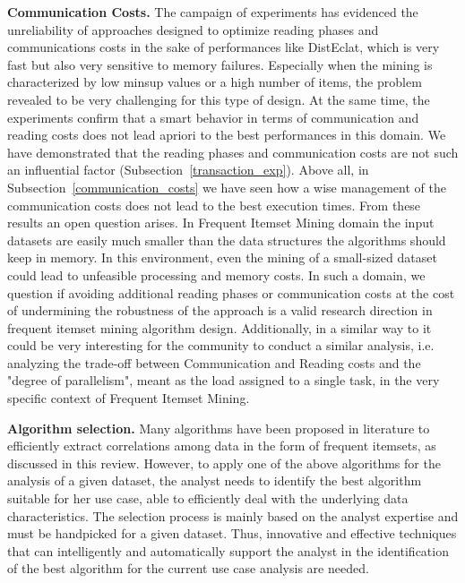 \textbf{Communication Costs.}
The campaign of experiments has evidenced the unreliability of approaches designed to optimize reading phases and communications costs in the sake of performances like DistEclat, which is very fast but also very sensitive to memory failures. Especially when the mining is characterized by low minsup values or a high number of items, the problem revealed to be very challenging for this type of design. 
At the same time, the experiments confirm that a smart behavior in terms of communication and reading costs does not lead apriori to the best performances in this domain. We have demonstrated that the reading phases and communication costs are not such an influential factor (Subsection~\ref{transaction_exp}). Above all, in Subsection~\ref{communication_costs} we have seen how a wise management of the communication costs does not lead to the best execution times. 
From these results an open question arises. In Frequent Itemset Mining domain the input datasets are easily much smaller than the data structures the algorithms should keep in memory. In this environment, even the mining of a small-sized dataset could lead to unfeasible processing and memory costs. In such a domain, we question if avoiding additional reading phases or communication costs at the cost of undermining the robustness of the approach is a valid research direction in frequent itemset mining algorithm design. 
Additionally, in a similar way to \cite{sarma2013upper} it could be very interesting for the community to conduct a similar analysis, i.e. analyzing the trade-off between Communication and Reading costs and the "degree of parallelism", meant as the load assigned to a single task, in the very specific context of Frequent Itemset Mining.




\textbf{Algorithm selection.}
Many algorithms have been proposed in literature
to efficiently extract correlations among data in the form of frequent itemsets,
as discussed in this review.
However, to apply one of the above algorithms for the analysis of a given
dataset, the analyst needs to identify
the best algorithm suitable for her use case,
able to efficiently deal with the
underlying data characteristics.
The selection process is mainly based on the analyst expertise and must be
handpicked for a given dataset.
Thus, innovative and effective techniques that can intelligently and
automatically support the analyst in the identification of the best algorithm
for the current use case analysis are needed.

